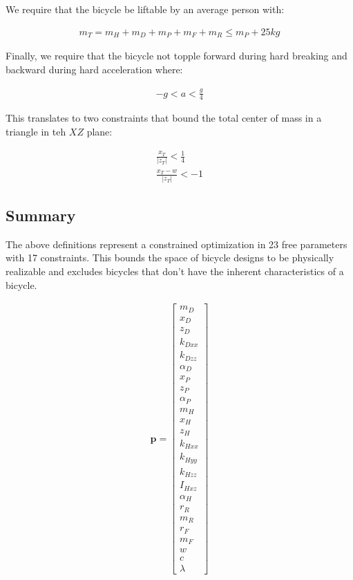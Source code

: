 \documentclass{article}
\begin{document}
We require that the bicycle be liftable by an average person with:

\begin{align}
  m_T = m_H + m_D + m_P + m_F + m_R \leq m_P + 25 \si{kg}
\end{align}

Finally, we require that the bicycle not topple forward during hard breaking
and backward during hard acceleration where:

\begin{align}
  -g < a < \frac{g}{4}
\end{align}

This translates to two constraints that bound the total center of mass in a triangle in teh $XZ$ plane:

\begin{align} \frac{x_T}{|z_T|} < \frac{1}{4} \\ \frac{x_T - w}{|z_T|} < -1
\end{align}

\subsection{Summary}

The above definitions represent a constrained optimization in 23 free
parameters with 17 constraints. This bounds the space of bicycle designs to be
physically realizable and excludes bicycles that don't have the inherent
characteristics of a bicycle.

\begin{align}
  \mathbf{p} =
  \begin{bmatrix}
    m_D \\
    x_D \\
    z_D \\
    k_{Dxx} \\
    k_{Dzz} \\
    \alpha_D \\
    x_P \\
    z_P \\
    \alpha_P \\
    m_H \\
    x_H \\
    z_H \\
    k_{Hxx} \\
    k_{Hyy} \\
    k_{Hzz} \\
    I_{Hxz} \\
    \alpha_H \\
    r_R \\
    m_R \\
    r_F \\
    m_F \\
    w \\
    c \\
    \lambda
  \end{bmatrix}
\end{align}
\end{document}
